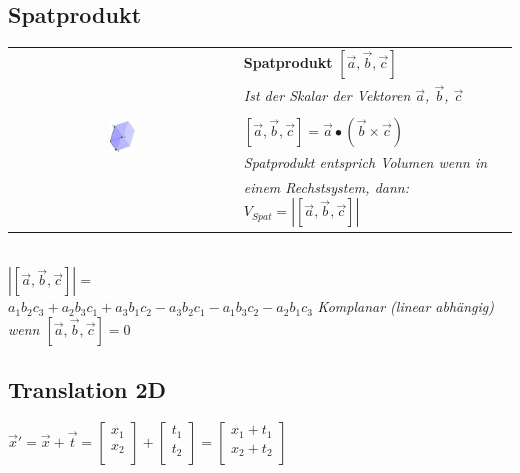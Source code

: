 \subsection{Spatprodukt}

\begin{tabular}{cl}
    \multirow{6}{*}{
        \includegraphics[width=0.12\textwidth]{assets/spatproduct.png}
    }
    & \textbf{Spatprodukt} $[\vec{a}, \vec{b}, \vec{c}]$ \\
    & \textit{Ist der Skalar der Vektoren $\vec{a}$, $\vec{b}$, $\vec{c}$} \\
    & \\
    & $[\vec{a}, \vec{b}, \vec{c}] = \vec{a} \bullet (\vec{b} \times \vec{c})$\\
    & \textit{Spatprodukt entsprich Volumen wenn in} \\
    & \textit{einem Rechstsystem, dann: $V_{Spat} = |[\vec{a}, \vec{b}, \vec{c}]|$} \\
\end{tabular} \\

$|[\vec{a}, \vec{b}, \vec{c}]| = $ \\
$a_1 b_2 c_3 + a_2 b_3 c_1 + a_3 b_1 c_2 - a_3 b_2 c_1 - a_1 b_3 c_2 - a_2 b_1 c_3$
\textit{Komplanar (linear abhängig) wenn $[\vec{a}, \vec{b}, \vec{c}] = 0$}

\subsection{Translation 2D}

$\vec{x}' = \vec{x} + \vec{t} = \begin{bmatrix}
    x_1 \\
    x_2 \\
\end{bmatrix} + \begin{bmatrix}
    t_1 \\
    t_2 \\
\end{bmatrix} = \begin{bmatrix}
    x_1 + t_1 \\
    x_2 + t_2 \\
\end{bmatrix}$

